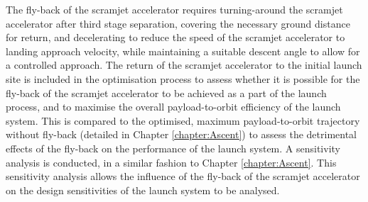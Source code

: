 The fly-back of the scramjet accelerator requires turning-around the scramjet accelerator after third stage separation, covering the necessary ground distance for return, and decelerating to reduce the speed of the scramjet accelerator to landing approach velocity, while maintaining a suitable descent angle to allow for a controlled approach. 
The return of the scramjet accelerator to the initial launch site is included in the optimisation process to assess whether it is possible for the fly-back of the scramjet accelerator to be achieved as a part of the launch process, and to maximise the overall payload-to-orbit efficiency of the launch system. This is compared to the optimised, maximum payload-to-orbit trajectory without fly-back (detailed in Chapter \ref{chapter:Ascent}) to assess the detrimental effects of the fly-back on the performance of the launch system. 
A sensitivity analysis is conducted, in a similar fashion to Chapter \ref{chapter:Ascent}. 
This sensitivity analysis allows the influence of the fly-back of the scramjet accelerator on the design sensitivities of the launch system to be analysed.


